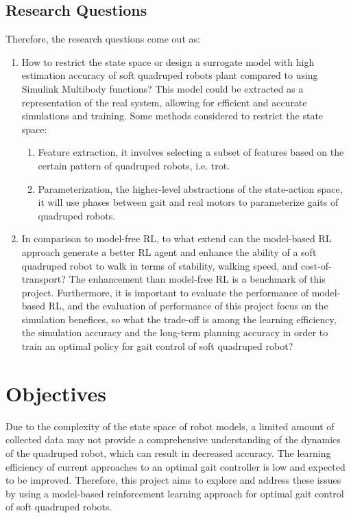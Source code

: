  \subsection*{Research Questions}
Therefore, the research questions come out as: 
\begin{enumerate}
    \item \label{rq1}How to restrict the state space or design a surrogate model with high estimation accuracy of soft quadruped robots plant compared to using Simulink Multibody functions? This model could be extracted as a representation of the real system, allowing for efficient and accurate simulations and training. Some methods considered to restrict the state space:
    \begin{enumerate}
        \item Feature extraction, it involves selecting a subset of features based on the certain pattern of quadruped robots, i.e. trot.
        \item Parameterization, the higher-level abstractions of the state-action space, it will use phases between gait and real motors to parameterize gaits of quadruped robots.
    \end{enumerate}
    \item \label{rq2}In comparison to model-free \ac{RL}, to what extend can the model-based \ac{RL} approach generate a better \ac{RL} agent and enhance the ability of a soft quadruped robot to walk in terms of stability, walking speed, and cost-of-transport? The enhancement than model-free \ac{RL} is a benchmark of this project. Furthermore, it is important to evaluate the performance of model-based \ac{RL}, and the evaluation of performance of this project focus on the simulation benefices, so what the trade-off is among the learning efficiency, the simulation accuracy and the long-term planning accuracy in order to train an optimal policy for gait control of soft quadruped robot?
\end{enumerate}

\section{Objectives} 
Due to the complexity of the state space of robot models, a limited amount of collected data may not provide a comprehensive understanding of the dynamics of the quadruped robot, which can result in decreased accuracy. The learning efficiency of current approaches to an optimal gait controller is low and expected to be improved. Therefore, this project aims to explore and address these issues by using a model-based reinforcement learning approach for optimal gait control of soft quadruped robots. 

